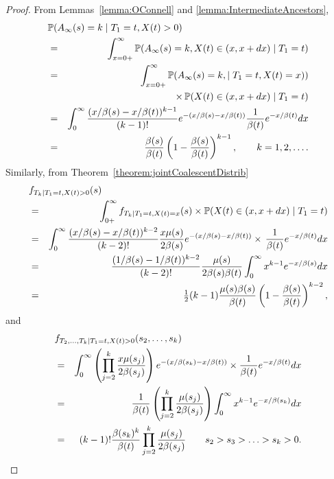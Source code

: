 \documentclass[preprint,12pt]{elsarticle}
\begin{document}
\begin{proof}
From Lemmas~\ref{lemma:OConnell} and \ref{lemma:IntermediateAncestors}, 
\begin{eqnarray*}
\lefteqn{\mathbb{P}(A_\infty(s) = k \mid T_1 = t, X(t) > 0)} \nonumber \\
	& = & \int_{x = 0+}^\infty \mathbb{P}(A_\infty(s) = k, X(t) \in (x, x + dx) \mid T_1 = t)  \nonumber \\
	& = & \int_{x = 0+}^\infty \mathbb{P}(A_\infty(s) = k, \mid T_1 = t, X(t) = x))  \nonumber \\
	& & \qquad\qquad\qquad\qquad  \times\, \mathbb{P}(X(t) \in (x, x + dx) \mid T_1 = t)  \nonumber \\
	& = & \int_0^\infty \frac{(x/\beta(s) - x/\beta(t))^{k - 1}}{(k - 1)!} e^{-(x/\beta(s) - x/\beta(t))} \frac{1}{\beta(t)} e^{-x/\beta(t)} dx   \nonumber \\
	& = & \frac{\beta(s)}{\beta(t)} \left(1 - \frac{\beta(s)}{\beta(t)}\right)^{k - 1}, \qquad k = 1, 2, \ldots.  
\end{eqnarray*}
Similarly, from Theorem~\ref{theorem:jointCoalescentDistrib} 
\begin{eqnarray*}
\lefteqn{f_{T_k \mid T_1 = t, X(t) >0}(s)} \nonumber \\
	& = & \int_{0+}^\infty f_{T_k \mid T_1 = t, X(t) = x}(s) \times \mathbb{P}(X(t) \in (x, x + dx) \mid T_1 = t)  \nonumber \\
	& = & \int_0^\infty \frac{(x/\beta(s) - x/\beta(t))^{k - 2}}{(k - 2)!} \frac{x \mu(s)}{2\beta(s)} e^{-(x/\beta(s) - x/\beta(t))} 
					\times\, \frac{1}{\beta(t)} e^{-x/\beta(t)} dx   \nonumber \\ 
	& = & \frac{(1/\beta(s) - 1/\beta(t))^{k - 2}}{(k - 2)!} \frac{\mu(s)}{2\beta(s)\beta(t)} \int_0^\infty x^{k - 1}  e^{-x/\beta(s)} dx   \nonumber \\
	& = & \tfrac{1}{2}(k - 1)\frac{\mu(s)\beta(s)}{\beta(t)} \left(1 - \frac{\beta(s)}{\beta(t)}\right)^{k - 2},  
\end{eqnarray*}
and 
\begin{eqnarray*}
\lefteqn{f_{T_2, \ldots, T_k \mid T_1 = t, X(t) > 0}(s_2, \ldots, s_k) } \nonumber \\
	& = & \int_0^\infty  \left(\prod_{j = 2}^k \frac{x \mu(s_j)}{2\beta(s_j)} \right) e^{-(x/\beta(s_k) - x/\beta(t))} \times \frac{1}{\beta(t)} e^{-x/\beta(t)} dx   \nonumber \\
	& = & \frac{1}{\beta(t)} \left(\prod_{j = 2}^k \frac{\mu(s_j)}{2\beta(s_j)} \right) \int_0^\infty x^{k - 1} e^{-x/\beta(s_k)} dx   \nonumber \\ 
	& = & (k - 1)! \frac{\beta(s_k)^k}{\beta(t)} \prod_{j = 2}^k \frac{\mu(s_j)}{2\beta(s_j)} \qquad s_2 > s_3 > \ldots > s_k > 0.   
\end{eqnarray*}
\end{proof}
\end{document}
